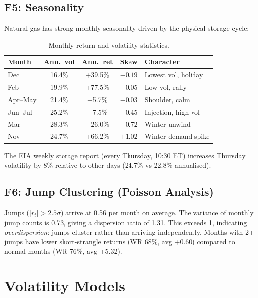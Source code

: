 \documentclass[11pt,a4paper]{article}
\begin{document}
\subsection{F5: Seasonality}

Natural gas has strong monthly seasonality driven by the physical storage cycle:

\begin{table}[H]
\centering
\caption{Monthly return and volatility statistics.}
\label{tab:seasonal}
\begin{tabular}{lcccl}
\toprule
Month & Ann.\ vol & Ann.\ ret & Skew & Character \\
\midrule
Dec & 16.4\% & +39.5\% & $-0.19$ & Lowest vol, holiday \\
Feb & 19.9\% & +77.5\% & $-0.05$ & Low vol, rally \\
Apr--May & 21.4\% & +5.7\% & $-0.03$ & Shoulder, calm \\
Jun--Jul & 25.2\% & $-7.5$\% & $-0.45$ & Injection, high vol \\
Mar & 28.3\% & $-26.0$\% & $-0.72$ & Winter unwind \\
Nov & 24.7\% & +66.2\% & $+1.02$ & Winter demand spike \\
\bottomrule
\end{tabular}
\end{table}

The EIA weekly storage report (every Thursday, 10:30 ET) increases Thursday volatility by 8\% relative to other days (24.7\% vs 22.8\% annualised).

\subsection{F6: Jump Clustering (Poisson Analysis)}

Jumps ($|r_t| > 2.5\sigma$) arrive at 0.56 per month on average. The variance of monthly jump counts is 0.73, giving a dispersion ratio of 1.31. This exceeds 1, indicating \textit{overdispersion}: jumps cluster rather than arriving independently. Months with 2+ jumps have lower short-strangle returns (WR 68\%, avg +0.60) compared to normal months (WR 76\%, avg +5.32).


\section{Volatility Models}
\label{sec:models}
\end{document}
